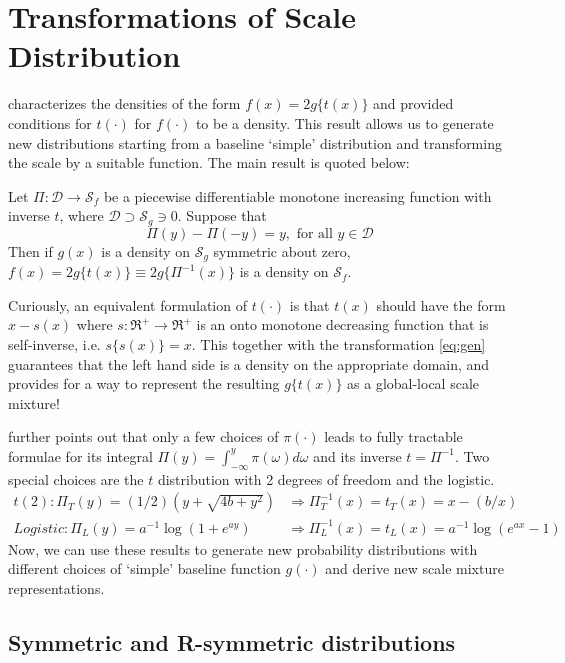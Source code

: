 \documentclass[lineno]{biometrika}
\begin{document}
\section{Transformations of Scale Distribution} 

\cite{jones2014generating} characterizes the densities of the form $f(x) = 2g\{ t(x) \}$ and provided conditions for $t(\cdot)$ for $f(\cdot)$ to be a density. This result allows us to generate new distributions starting from a baseline `simple' distribution and transforming the scale by a suitable function. The main result is quoted below: 
\begin{proposition}\label{prop:jones}
Let $\Pi: \mathcal{D} \to \mathcal{S}_{f}$ be a piecewise differentiable monotone increasing function with inverse $t$, where $\mathcal{D} \supset \mathcal{S}_{g} \ni 0$. Suppose that 
$$
\Pi(y) - \Pi(-y) = y, \text{ for all } y \in \mathcal{D}
$$
Then if $g(x)$ is a density on $\mathcal{S}_{g}$ symmetric about zero, $f(x) = 2g \{ t(x) \} \equiv 2g \{ \Pi^{-1}(x) \}$ is a density on 
$\mathcal{S}_{f}$.
\end{proposition}
Curiously, an equivalent formulation of $t(\cdot)$ is that $t(x)$ should have the form $x-s(x)$ where $s : \Re^+ \to \Re^+$ is an onto monotone decreasing function that is self-inverse, i.e. $s\{ s(x)\} = x$. This together with the \CS transformation \eqref{eq:gen} guarantees that the left hand side is a density on the appropriate domain, and provides for a way to represent the resulting $g\{t(x)\}$ as a global-local scale mixture! 
 
\cite{jones2014generating} further points out that only a few choices of $\pi(\cdot)$ leads to fully tractable formulae for its integral $\Pi(y) = \int_{-\infty}^{y} \pi(\omega) d\omega$ and its inverse $t = \Pi^{-1}$. Two special choices are the $t$ distribution with 2 degrees of freedom and the logistic. 
\begin{align}
t(2): \Pi_{T}(y) = (1/2)(y+\sqrt{4b+y^2}) & \Rightarrow \Pi_T^{-1}(x) = t_T(x) = x - (b/x) \\
Logistic: \Pi_{L}(y) = a^{-1} \log(1+e^{ay}) & \Rightarrow \Pi_L^{-1}(x) = t_L(x) = a^{-1} \log(e^{ax}-1) 
\end{align}
Now, we can use these results to generate new probability distributions with different choices of `simple' baseline function $g(\cdot)$ and derive new scale mixture representations. 

\subsection{Symmetric and R-symmetric distributions}
\end{document}
